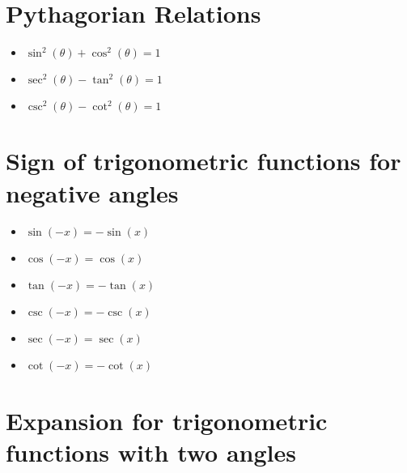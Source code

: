 \documentclass{article}
\begin{document}
\section{Pythagorian Relations}
\begin{itemize}
\item $\sin^2(\theta)+\cos^2(\theta) = 1$
\item $\sec^2(\theta)-\tan^2(\theta) = 1$
\item $\csc^2(\theta)-\cot^2(\theta) = 1$
\end{itemize}

\maketitle
\section{Sign of trigonometric functions for negative angles}

\begin{itemize}
\item $\sin(-x) = -\sin(x)$
\item $\cos(-x) = \cos(x)$
\item $\tan(-x) = -\tan(x)$
\item $\csc(-x) = -\csc(x)$
\item $\sec(-x) = \sec(x)$
\item $\cot(-x) = -\cot(x)$
\end{itemize}

\maketitle
\section{Expansion for trigonometric functions with two angles}
\end{document}
